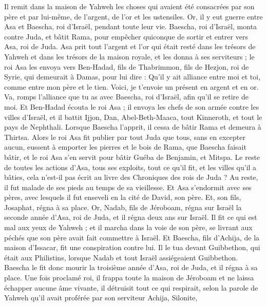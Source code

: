 \begin{multicols}{2}
Il remit dans la maison de Yahweh les choses qui avaient été consacrées par son père et par lui-même, de l'argent, de l'or et les ustensiles.
Or, il y eut guerre entre Asa et Baescha, roi d'Israël, pendant toute leur vie.
Baescha, roi d'Israël, monta contre Juda, et bâtit Rama, pour empêcher quiconque de sortir et entrer vers Asa, roi de Juda.
Asa prit tout l'argent et l'or qui était resté dans les trésors de Yahweh et dans les trésors de la maison royale, et les donna à ses serviteurs ; le roi Asa les envoya vers Ben-Hadad, fils de Thabrimmon, fils de Hezjon, roi de Syrie, qui demeurait à Damas, pour lui dire :
Qu’il y ait alliance entre moi et toi, comme entre mon père et le tien. Voici, je t'envoie un présent en argent et en or. Va, romps l'alliance que tu as avec Baescha, roi d'Israël, afin qu'il se retire de moi.
Et Ben-Hadad écouta le roi Asa ; il envoya les chefs de son armée contre les villes d'Israël, et il battit Ijjon, Dan, Abel-Beth-Maaca, tout Kinneroth, et tout le pays de Nephthali.
Lorsque Baescha l’apprit, il cessa de bâtir Rama et demeura à Thirtsa.
Alors le roi Asa fit publier par tout Juda que tous, sans en excepter aucun, eussent à emporter les pierres et le bois de Rama, que Baescha faisait bâtir, et le roi Asa s’en servit pour bâtir Guéba de Benjamin, et Mitspa.
Le reste de toutes les actions d'Asa, tous ses exploits, tout ce qu'il fit, et les villes qu'il a bâties, cela n'est-il pas écrit au livre des Chroniques des rois de Juda ? Au reste, il fut malade de ses pieds au temps de sa vieillesse.
Et Asa s'endormit avec ses pères, avec lesquels il fut enseveli en la cité de David, son père. Et, son fils, Josaphat, régna à sa place.
Or, Nadab, fils de Jéroboam, régna sur Israël la seconde année d'Asa, roi de Juda, et il régna deux ans sur Israël.
Il fit ce qui est mal aux yeux de Yahweh ; et il marcha dans la voie de son père, se livrant aux péchés que son père avait fait commettre à Israël.
Et Baescha, fils d'Achija, de la maison d'Issacar, fit une conspiration contre lui. Il le tua devant Guibbethon, qui était aux Philistins, lorsque Nadab et tout Israël assiégeaient Guibbethon.
Baescha le fit donc mourir la troisième année d'Asa, roi de Juda, et il régna à sa place.
Une fois proclamé roi, il frappa toute la maison de Jéroboam et ne laissa échapper aucune âme vivante, il détruisit tout ce qui respirait, selon la parole de Yahweh qu'il avait proférée par son serviteur Achija, Silonite,

\end{multicols}
